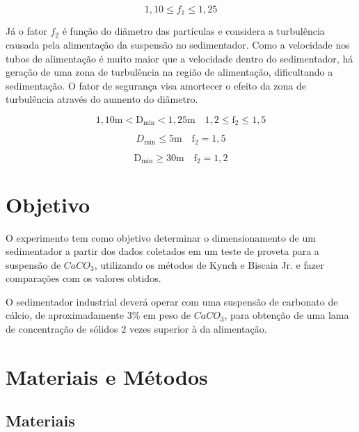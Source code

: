 \begin{equation}\label{key}
1,10 \leq f_{1} \leq 1,25
\end{equation}


Já o fator $ f_{2} $ é função do diâmetro das partículas e considera a turbulência causada pela alimentação da suspensão no sedimentador. Como a velocidade nos tubos de alimentação é muito maior que a velocidade dentro do sedimentador, há geração de uma zona de turbulência na região de alimentação, dificultando a sedimentação. O fator de segurança visa amortecer o efeito da zona de turbulência através do aumento do diâmetro.

\begin{equation}\label{key}
1,10 \mathrm{m}<\mathrm{D}_{\mathrm{min}}<1,25 \mathrm{m} \quad 1,2 \leq \mathrm{f}_{2} \leq 1,5
\end{equation}

\begin{equation}\label{key}
D_{\min } \leq 5 \mathrm{m} \quad \mathrm{f}_{2}=1,5
\end{equation}

\begin{equation}\label{key}
\mathrm{D}_{\mathrm{min}} \geq 30 \mathrm{m} \quad \mathrm{f}_{2}=1,2
\end{equation}


\chapter{Objetivo}


O experimento tem como objetivo determinar o dimensionamento de um sedimentador a partir dos dados coletados em um teste de proveta para a suspensão de $ CaCO_{3} $, utilizando os métodos de Kynch e Biscaia Jr. e fazer comparações com os valores obtidos.

O sedimentador industrial deverá operar com uma suspensão de carbonato de cálcio, de aproximadamente 3\% em peso de $ CaCO_{3} $, para obtenção de uma lama de concentração de sólidos 2 vezes superior à da alimentação.
\\


\chapter{Materiais e Métodos}

\section{Materiais}

